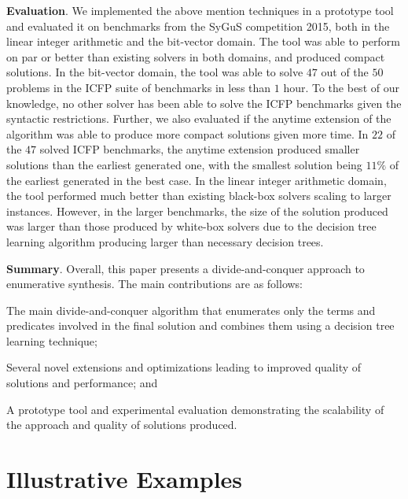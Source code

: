 \documentclass{llncs}
\newcommand{\sygus}{{\sffamily\fontsize{8.5}{10}\selectfont
    SyGuS}\xspace}
\renewcommand{\paragraph}[1]{\par\noindent\textbf{#1}.}
\begin{document}
\paragraph{Evaluation}
We implemented the above mention techniques in a prototype tool and
evaluated it on benchmarks from the \sygus competition 2015, both in the
linear integer arithmetic and the bit-vector domain.
The tool was able to perform on par or better than existing solvers in
both domains, and produced compact solutions.
In the bit-vector domain, the tool was able to solve $47$ out of the
$50$ problems in the ICFP suite of benchmarks in less than $1$ hour.
To the best of our knowledge, no other solver has been able to solve the
ICFP benchmarks given the syntactic restrictions.
Further, we also evaluated if the anytime extension of the algorithm was
able to produce more compact solutions given more time.
In $22$ of the $47$ solved ICFP benchmarks, the anytime extension
produced smaller solutions than the earliest generated one, with the
smallest solution being $11\%$ of the earliest generated in the best
case.
In the linear integer arithmetic domain, the tool performed much better
than existing black-box solvers scaling to larger instances.
However, in the larger benchmarks, the size of the solution produced was
larger than those produced by white-box solvers due to the decision tree
learning algorithm producing larger than necessary decision trees.

\paragraph{Summary}
Overall, this paper presents a divide-and-conquer approach to
enumerative synthesis.
The main contributions are as follows:
\begin{inparaenum}[(a)]
\item The main divide-and-conquer algorithm that enumerates only the
  terms and predicates involved in the final solution and combines them
  using a decision tree learning technique;
\item Several novel extensions and optimizations leading to improved
  quality of solutions and performance; and
\item A prototype tool and experimental evaluation demonstrating the
  scalability of the approach and quality of solutions produced.
\end{inparaenum}

\section{Illustrative Examples}
\label{sec:example}
\end{document}
